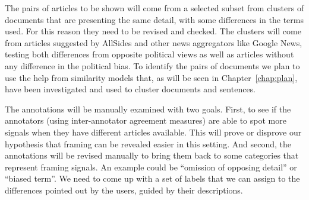 The pairs of articles to be shown will come from a selected subset from clusters of documents that are presenting the same detail, with some differences in the terms used. For this reason they need to be revised and checked.
The clusters will come from articles suggested by AllSides and other news aggregators like Google News, testing both differences from opposite political views as well as articles without any difference in the political bias.
To identify the pairs of documents we plan to use the help from similarity models that, as will be seen in Chapter~\ref{chap:plan}, have been investigated and used to cluster documents and sentences.





The annotations will be manually examined with two goals.
First, to see if the annotators (using inter-annotator agreement measures) are able to spot more signals when they have different articles available.
This will prove or disprove our hypothesis that framing can be revealed easier in this setting.
And second, the annotations will be revised manually to bring them back to some categories that represent framing signals. An example could be ``omission of opposing detail'' or ``biased term''. We need to come up with a set of labels that we can assign to the differences pointed out by the users, guided by their descriptions.



